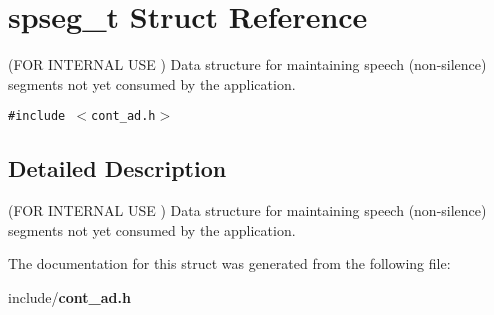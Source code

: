 \section{spseg\_\-t Struct Reference}
\label{structspseg__t}
(FOR INTERNAL USE ) Data structure for maintaining speech (non-silence) segments not yet consumed by the application.  


{\tt \#include $<$cont\_\-ad.h$>$}



\subsection{Detailed Description}
(FOR INTERNAL USE ) Data structure for maintaining speech (non-silence) segments not yet consumed by the application. 

The documentation for this struct was generated from the following file:\begin{CompactItemize}
\item 
include/{\bf cont\_\-ad.h}\end{CompactItemize}
